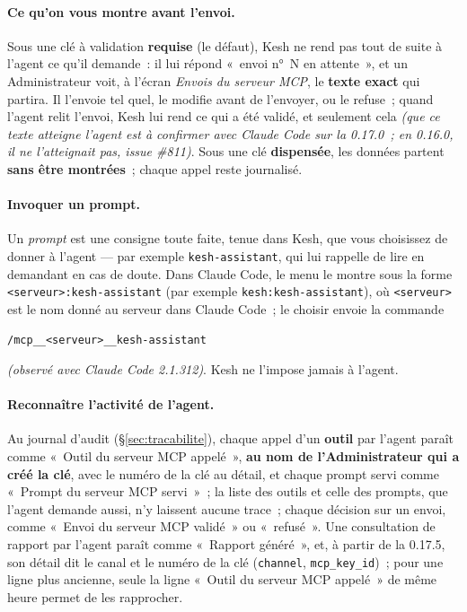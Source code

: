 \documentclass[a4paper,11pt,oneside]{article}
\begin{document}
\paragraph{Ce qu'on vous montre avant l'envoi.} Sous une clé à validation \textbf{requise} (le
défaut), Kesh ne rend pas tout de suite à l'agent ce qu'il demande~: il lui répond
«~envoi n°~N en attente~», et un Administrateur voit, à l'écran \emph{Envois du serveur MCP},
le \textbf{texte exact} qui partira. Il l'envoie tel quel, le modifie avant de l'envoyer, ou le
refuse~; quand l'agent relit l'envoi, Kesh lui rend ce qui a été validé, et seulement
cela \emph{(que ce texte atteigne l'agent est à confirmer avec Claude Code sur la 0.17.0~; en
0.16.0, il ne l'atteignait pas, issue \#811)}. Sous une clé
\textbf{dispensée}, les données partent \textbf{sans être montrées}~; chaque appel reste
journalisé.

\paragraph{Invoquer un prompt.} Un \emph{prompt} est une consigne toute faite, tenue dans Kesh,
que vous choisissez de donner à l'agent --- par exemple \texttt{kesh-assistant}, qui lui
rappelle de lire en demandant en cas de doute. Dans Claude Code, le menu le montre sous la
forme \texttt{<serveur>:kesh-assistant} (par exemple \texttt{kesh:kesh-assistant}), où
\texttt{<serveur>} est le nom donné au serveur dans Claude Code~; le choisir envoie la commande
\begin{center}
\texttt{/mcp\_\_<serveur>\_\_kesh-assistant}
\end{center}
\noindent\emph{(observé avec Claude Code 2.1.312)}. Kesh ne l'impose jamais à l'agent.

\paragraph{Reconnaître l'activité de l'agent.} Au journal d'audit (\S\ref{sec:tracabilite}),
chaque appel d'un \textbf{outil} par l'agent paraît comme «~Outil du serveur MCP appelé~»,
\textbf{au nom de l'Administrateur qui a créé la clé}, avec le numéro de la clé au détail, et
chaque prompt servi comme «~Prompt du serveur MCP servi~»~; la liste des outils et celle des
prompts, que l'agent demande aussi, n'y laissent aucune trace~; chaque décision sur
un envoi, comme «~Envoi du serveur MCP validé~» ou «~refusé~». Une
consultation de rapport par l'agent paraît comme «~Rapport généré~», et, à partir de la 0.17.5,
son détail dit le canal et le numéro de la clé (\texttt{channel}, \texttt{mcp\_key\_id})~; pour
une ligne plus ancienne, seule la ligne «~Outil du serveur MCP appelé~» de même heure permet de
les rapprocher.
\end{document}
